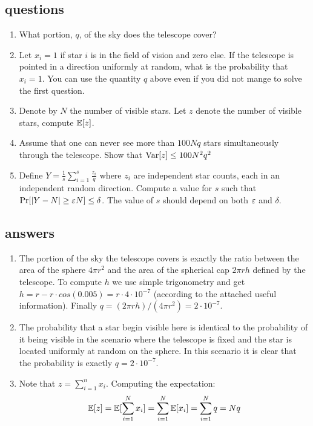 \documentclass{article}
\begin{document}
\subsection*{questions}
\begin{enumerate}
\item What portion, $q$, of the sky does the telescope cover?
\item Let $x_i = 1$ if star $i$ is in the field of vision and zero else. 
If the telescope is pointed in a direction uniformly at random, what is the probability that $x_i = 1$.
You can use the quantity $q$ above even if you did not mange to solve the first question.
\item Denote by $N$ the number of visible stars. Let $z$ denote the number of visible stars, compute ${\mathbb E}[z]$.
\item Assume that one can never see more than $100Nq$ stars simultaneously through the telescope.
Show that ${\operatorname{Var}}[z] \le 100N^2q^2$
\item Define $Y = \frac{1}{s}\sum_{i=1}^{s}\frac{z_i}{q}$ where $z_i$ are independent star counts, each in an independent random direction. 
Compute a value for $s$ such that $\Pr[|Y - N| \ge \varepsilon N] \le \delta$.
The value of $s$ should depend on both $\varepsilon$ and $\delta$.
\end{enumerate}




\pagebreak
\subsection*{answers}
\begin{enumerate}
\item The portion of the sky the telescope covers is exactly the ratio between the area of the sphere $4\pi r^2$ and the area of the spherical cap $2\pi r h$ defined by the telescope. To compute $h$ we use simple trigonometry and get $h = r - r\cdot cos(0.005) = r \cdot 4\cdot10^{-7}$ (according to the attached useful information).
Finally $q = (2\pi r h)/(4\pi r^2) = 2\cdot10^{-7}$.
\item The probability that a star begin visible here is identical to the probability of it being visible in the scenario where the telescope is fixed and the star is located uniformly at random on the sphere.
In this scenario it is clear that the probability is exactly $q = 2\cdot10^{-7}$.
\item Note that $z = \sum_{i=1}^{n}x_i$. Computing the expectation:
$$
{\mathbb E}[z] = {\mathbb E}[\sum_{i=1}^{N}x_i] = \sum_{i=1}^{N} {\mathbb E}[x_i] = \sum_{i=1}^{N}q = Nq
$$
\end{enumerate}
\pagebreak
\end{document}
